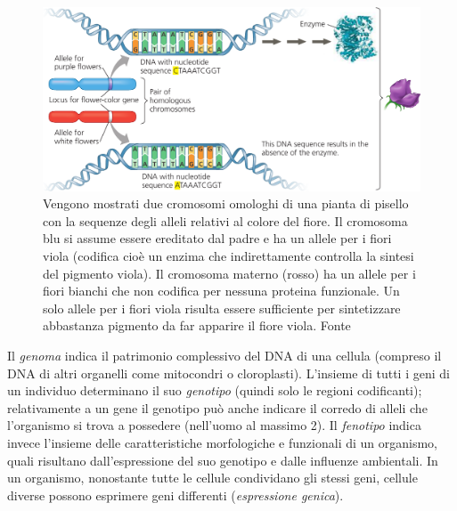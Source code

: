 \begin{figure}[!htb]
	\centering
	\includegraphics[scale=0.5]{images/geni-allele.png}
	\caption{Vengono mostrati due cromosomi omologhi di una pianta di pisello con la sequenze degli alleli relativi al colore del fiore. Il cromosoma blu si assume essere ereditato dal padre e ha un allele per i fiori viola (codifica cioè un enzima che indirettamente controlla la sintesi del pigmento viola). Il cromosoma materno (rosso) ha un allele per i fiori bianchi che non codifica per nessuna proteina funzionale. Un solo allele per i fiori viola risulta essere sufficiente per sintetizzare abbastanza pigmento da far apparire il fiore viola. Fonte\cite{campbell}}
	\label{fig:}
\end{figure}

\par Il \textit{genoma} indica il patrimonio complessivo del DNA di una cellula (compreso il DNA di altri organelli come mitocondri o cloroplasti). L'insieme di tutti i geni di un individuo determinano il suo \textit{genotipo} (quindi solo le regioni codificanti); relativamente a un gene il genotipo può anche indicare il corredo di alleli che l'organismo si trova a possedere (nell'uomo al massimo 2). Il \textit{fenotipo} indica invece l'insieme delle caratteristiche morfologiche e funzionali di un organismo, quali risultano dall'espressione del suo genotipo e dalle influenze ambientali. In un organismo, nonostante tutte le cellule condividano gli stessi geni, cellule diverse possono esprimere geni differenti (\textit{espressione genica}).

